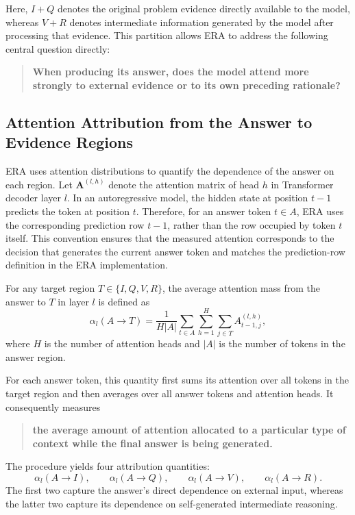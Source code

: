 Here, $I+Q$ denotes the original problem evidence directly available to the model, whereas $V+R$ denotes intermediate information generated by the model after processing that evidence. This partition allows ERA to address the following central question directly:

\begin{quote}
\centering
\textbf{When producing its answer, does the model attend more strongly to external evidence or to its own preceding rationale?}
\end{quote}

\subsection{Attention Attribution from the Answer to Evidence Regions}
\label{subsec:era_attribution}

ERA uses attention distributions to quantify the dependence of the answer on each region. Let $\mathbf A^{(l,h)}$ denote the attention matrix of head $h$ in Transformer decoder layer $l$. In an autoregressive model, the hidden state at position $t-1$ predicts the token at position $t$. Therefore, for an answer token $t\in A$, ERA uses the corresponding prediction row $t-1$, rather than the row occupied by token $t$ itself. This convention ensures that the measured attention corresponds to the decision that generates the current answer token and matches the prediction-row definition in the ERA implementation.

For any target region $T\in\{I,Q,V,R\}$, the average attention mass from the answer to $T$ in layer $l$ is defined as
\[
\alpha_l(A\rightarrow T)
=
\frac{1}{H\lvert A\rvert}
\sum_{t\in A}
\sum_{h=1}^{H}
\sum_{j\in T}
A^{(l,h)}_{t-1,j},
\]
where $H$ is the number of attention heads and $\lvert A\rvert$ is the number of tokens in the answer region.

For each answer token, this quantity first sums its attention over all tokens in the target region and then averages over all answer tokens and attention heads. It consequently measures

\begin{quote}
\centering
\textbf{the average amount of attention allocated to a particular type of context while the final answer is being generated.}
\end{quote}

The procedure yields four attribution quantities:
\[
\alpha_l(A\rightarrow I),\qquad
\alpha_l(A\rightarrow Q),\qquad
\alpha_l(A\rightarrow V),\qquad
\alpha_l(A\rightarrow R).
\]
The first two capture the answer's direct dependence on external input, whereas the latter two capture its dependence on self-generated intermediate reasoning.

